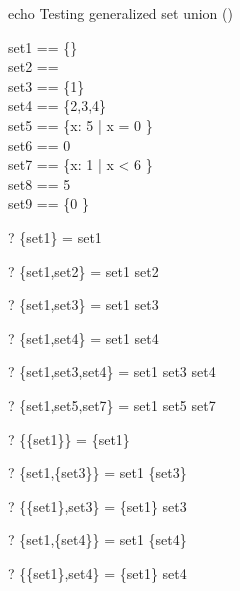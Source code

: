 echo     Testing generalized set union (\bigcup)
\begin{zed}
set1 == \{\} \\                 %
set2 == \emptyset \\            %
set3 == \{1\} \\                %
set4 == \{2,3,4\} \\            %
set5 == \{x: 5  | x  = 0 \} \\
set6 == 0   \\
set7 == \{x: 1  | x < 6 \} \\
set8 == 5  \\
set9 == \{0 \} \\
\end{zed}

\begin{zed} \vdash? \bigcup \{set1\}        = set1 \end{zed}
\begin{zed} \vdash? \bigcup \{set1,set2\}   = set1 \cup set2 \end{zed}
\begin{zed} \vdash? \bigcup \{set1,set3\}   = set1 \cup set3 \end{zed}
\begin{zed} \vdash? \bigcup \{set1,set4\}   = set1 \cup set4 \end{zed}
\begin{zed} \vdash? \bigcup \{set1,set3,set4\} = set1 \cup set3 \cup set4 \end{zed}
\begin{zed} \vdash? \bigcup \{set1,set5,set7\} = set1 \cup set5 \cup set7 \end{zed}
\begin{zed} \vdash? \bigcup \{\{set1\}\}    = \{set1\} \end{zed}
\begin{zed} \vdash? \bigcup \{set1,\{set3\}\} = set1 \cup \{set3\} \end{zed}
\begin{zed} \vdash? \bigcup \{\{set1\},set3\} = \{set1\} \cup set3 \end{zed}
\begin{zed} \vdash? \bigcup \{set1,\{set4\}\} = set1 \cup \{set4\} \end{zed}
\begin{zed} \vdash? \bigcup \{\{set1\},set4\} = \{set1\} \cup set4 \end{zed}

